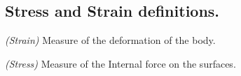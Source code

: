 
\subsection{Stress and Strain definitions.}

\begin{definition}
\emph{(Strain)}
\label{dfn:continuumL2:30}
Measure of the deformation of the body.
\end{definition}

\begin{definition}
\emph{(Stress)}
\label{dfn:continuumL2:10}
Measure of the Internal force on the surfaces.
\end{definition}

